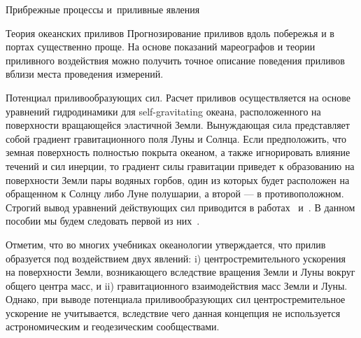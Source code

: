 \begin{chapter}{Прибрежные процессы и~приливные явления}
\begin{section}{Теория океанских приливов}
Прогнозирование приливов вдоль побережья и в портах существенно проще.
На основе показаний мареографов и теории приливного воздействия
можно получить точное описание поведения приливов вблизи места проведения
измерений.
%

\begin{paragraph}{Потенциал приливообразующих сил.}
Расчет приливов осуществляется
на основе уравнений гидродинамики для self-gravitating океана,
расположенного на поверхности вращающейся эластичной Земли.
Вынуждающая сила представляет собой градиент гравитационного поля 
Луны и Солнца. Если предположить, что земная поверхность 
полностью покрыта океаном, а также игнорировать влияние течений и сил инерции,
то градиент силы гравитации приведет к образованию на поверхности Земли
пары водяных горбов, один из которых будет расположен на обращенном к Солнцу
либо Луне полушарии, а второй --- в противоположном. Строгий вывод уравнений
действующих сил приводится в работах~\cite{Pugh:1987} 
и~\cite{Dietrich:1980}. 
В данном пособии мы будем следовать первой из них~\cite[\S~3.2]{Pugh:1987}.
%

Отметим, что во многих учебниках океанологии утверждается, что прилив
образуется под воздействием двух явлений:
i) центростремительного ускорения на поверхности Земли, возникающего 
вследствие вращения Земли и Луны вокруг общего центра масс, и
ii) гравитационного взаимодействия масс Земли и Луны. 
Однако, при выводе потенциала приливообразующих сил центростремительное
ускорение не учитывается, вследствие чего данная концепция не используется
астрономическим и геодезическим сообществами.
%


\end{paragraph}
\end{section}
\end{chapter}
